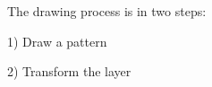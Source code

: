 \documentclass[preview]{standalone}
\begin{document}
\begin{center}
The drawing process is in two steps:

1) Draw a pattern

2) Transform the layer
\end{center}
\end{document}
